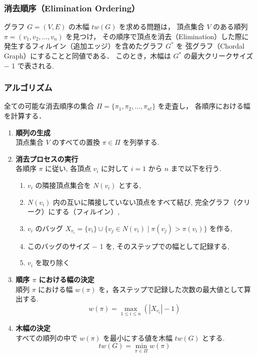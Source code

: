 \documentclass[technicalreport]{ieicej}
\begin{document}
\subsubsection{消去順序（Elimination Ordering）}
グラフ $G=(V, E)$ の木幅 $tw(G)$ を求める問題は，
頂点集合 $V$ のある順列 $\pi = (v_1, v_2, \dots, v_n)$ を見つけ，
その順序で頂点を消去（Elimination）した際に発生するフィルイン（追加エッジ）を含めたグラフ $G^*$ を
弦グラフ（Chordal Graph）にすることと同値である．
このとき，木幅は $G^*$ の最大クリークサイズ − 1 で表される.

\subsubsection{アルゴリズム}
全ての可能な消去順序の集合 $\Pi = \{\pi_1, \pi_2, \dots, \pi_{n!}\}$ を走査し，
各順序における幅を計算する．

\begin{enumerate}
    \item \textbf{順列の生成}\\ 頂点集合 $V$ のすべての置換 $\pi \in \Pi$ を列挙する.

    \item \textbf{消去プロセスの実行}\\
    各順序 $\pi$ に従い, 各頂点 $v_i$ に対して $i=1$ から $n$ まで以下を行う.
    \begin{enumerate}
        \item $v_i$ の隣接頂点集合を $N(v_i)$ とする,
        \item $N(v_i)$ 内の互いに隣接していない頂点をすべて結び, 完全グラフ（クリーク）にする（フィルイン）,
        \item $v_i$ のバッグ $X_{v_i} = \{v_i\} \cup \{v_j \in N(v_i) \mid \pi(v_j) > \pi(v_i)\}$ を作る, 
        \item このバッグのサイズ − 1 を, そのステップでの幅として記録する,
        \item $v_i$ を取り除く
    \end{enumerate}

    \item \textbf{順序 $\pi$ における幅の決定}\\
    順列 $\pi$ における幅 $w(\pi)$ を，各ステップで記録した次数の最大値として算出する. 
    \[
    w(\pi) = \max_{1 \le i \le n} (|X_{v_i}| - 1)
    \]

    \item \textbf{木幅の決定}\\
    すべての順列の中で $w(\pi)$ を最小にする値を木幅 $tw(G)$ とする.
    \[
    tw(G) = \min_{\pi \in \Pi} w(\pi)
    \]
\end{enumerate}
\end{document}
